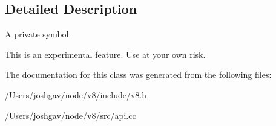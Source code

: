 \subsection{Detailed Description}
A private symbol

This is an experimental feature. Use at your own risk. 

The documentation for this class was generated from the following files\+:\begin{DoxyCompactItemize}
\item 
/\+Users/joshgav/node/v8/include/v8.\+h\item 
/\+Users/joshgav/node/v8/src/api.\+cc\end{DoxyCompactItemize}
